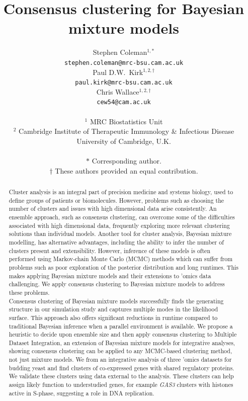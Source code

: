 \documentclass[12pt]{article}
\title{Consensus clustering for Bayesian mixture models}
\author{
	Stephen Coleman$^{1,*}$ \\
	\texttt{stephen.coleman@mrc-bsu.cam.ac.uk} \\
	\AND
	Paul D.W.~Kirk$^{1,2,\dagger}$ \\
	\texttt{paul.kirk@mrc-bsu.cam.ac.uk} \\
	\AND
	Chris Wallace$^{1,2,\dagger}$ \\
	\texttt{cew54@cam.ac.uk} \\ 
	\vspace{1cm} \\
	$^1$ MRC Biostatistics Unit\\
	$^2$ Cambridge Institute of Therapeutic Immunology \& Infectious Disease \\
	University of Cambridge, U.K. \\
	\vspace{2cm} \\
	$*$ Corresponding author. \\
	$\dagger$ These authors provided an equal contribution.	
}
\begin{document}
	
	\maketitle
	
	\newpage
	
	\begin{abstract}
		Cluster analysis is an integral part of precision medicine and systems biology, used to define groups of patients or biomolecules. However, problems such as choosing the number of clusters and issues with high dimensional data arise consistently. An ensemble approach, such as consensus clustering, can overcome some of the difficulties associated with high dimensional data, frequently exploring more relevant clustering solutions than individual models. Another tool for cluster analysis, Bayesian mixture modelling, has alternative advantages, including the ability to infer the number of clusters present and extensibility. 
		However, inference of these models is often performed using Markov-chain Monte Carlo (MCMC) methods which can suffer from problems such as poor exploration of the posterior distribution and long runtimes.
		This makes applying Bayesian mixture models and their extensions to 'omics data challenging. We apply
		consensus clustering to Bayesian mixture models to address these problems. 
		\\
		Consensus clustering of Bayesian mixture models successfully finds the generating structure in our simulation study and captures multiple modes in the likelihood surface. This approach also offers significant reductions in runtime compared to traditional Bayesian inference when a parallel environment is available. We propose a heuristic to decide upon ensemble size and then apply consensus clustering to Multiple Dataset Integration, an extension of Bayesian mixture models for integrative analyses, showing consensus clustering can be applied to any MCMC-based clustering method, not just mixture models. We from an integrative analysis of three 'omics datasets for budding yeast and find clusters of co-expressed genes with shared regulatory proteins. We validate these clusters using data external to the analysis. These clusters can help assign likely function to understudied genes, for example \emph{GAS3} clusters with histones active in S-phase, suggesting a role in DNA replication.

\end{abstract}
\end{document}
